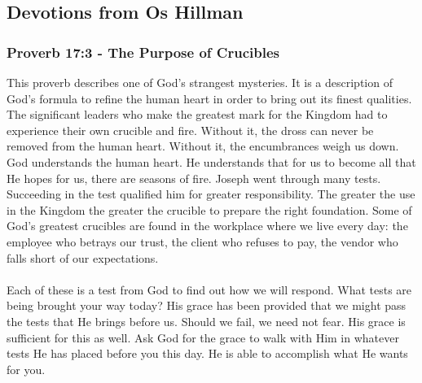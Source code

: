 \subsection{Devotions from Os Hillman}


\subsubsection{Proverb 17:3 - The Purpose of Crucibles}


This proverb describes one of God’s strangest mysteries. It is a description of God’s
formula to refine the human heart in order to bring out its finest qualities. The
significant leaders who make the greatest mark for the Kingdom had to experience
their own crucible and fire. Without it, the dross can never be removed from the
human heart. Without it, the encumbrances weigh us down. God understands the
human heart. He understands that for us to become all that He hopes for us, there
are seasons of fire. Joseph went through many tests. Succeeding in the test qualified
him for greater responsibility. The greater the use in the Kingdom the greater the
crucible to prepare the right foundation. Some of God’s greatest crucibles are found
in the workplace where we live every day: the employee who betrays our trust, the
client who refuses to pay, the vendor who falls short of our expectations.\\
\\
\noindent Each of these is a test from God to find out how we will respond. What tests
are being brought your way today? His grace has been provided that we might pass the tests that He brings before us. Should we fail, we need not fear. His grace is
sufficient for this as well. Ask God for the grace to walk with Him in whatever tests
He has placed before you this day. He is able to accomplish what He wants for you.






